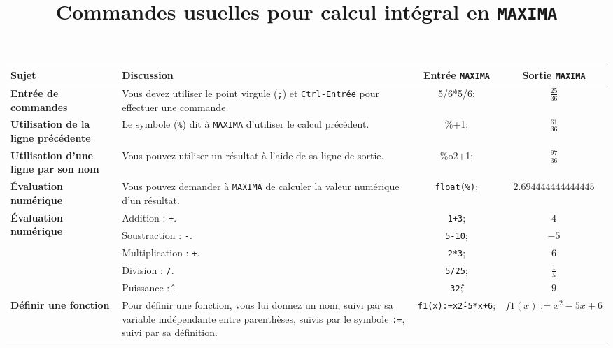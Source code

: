 \documentclass[landscape]{article}
\title{Commandes usuelles pour calcul intégral en \texttt{MAXIMA}}
\author{}
\date{}
\begin{document}
\maketitle

\begin{center}
\begin{longtable}{@{}p{4cm}p{12cm}cc@{}}
\toprule
\textbf{Sujet} & \textbf{Discussion} & \textbf{Entrée \texttt{MAXIMA}} & \textbf{Sortie \texttt{MAXIMA}} \\ 
\midrule
\endhead

\textbf{Entrée de commandes} & Vous devez utiliser le point virgule (\texttt{;}) et \texttt{Ctrl-Entrée} pour effectuer une commande &
5/6*5/6; & $\frac{25}{36}$ \\

\midrule

\textbf{Utilisation de la ligne précédente} & Le symbole (\texttt{\%}) dit à \texttt{MAXIMA} d'utiliser le calcul précédent. &
\%+1; & $\frac{61}{36}$ \\

\midrule

\textbf{Utilisation d'une ligne  par son nom} & Vous pouvez utiliser un résultat à l'aide de sa ligne de sortie. &
\%o2+1; & $\frac{97}{36}$ \\

\midrule

\textbf{Évaluation numérique} & Vous pouvez demander à \texttt{MAXIMA} de calculer la valeur numérique d'un résultat. &
\texttt{float(\%)}; & $2.694444444444445$ \\

\midrule

\multirow{5}{*}{\textbf{Évaluation numérique}} & Addition : \texttt{+}. & \texttt{1+3}; & $4$ \\
& Soustraction : \texttt{-}. & \texttt{5-10}; & $-5$ \\
& Multiplication : \texttt{+}. & \texttt{2*3}; & $6$ \\
& Division : \texttt{/}. & \texttt{5/25}; & $\frac{1}{5}$ \\
& Puissance : \^. & \texttt{3\^2}; & $9$ \\

\midrule

\textbf{Définir une fonction} & Pour définir une fonction, vous lui donnez un nom, suivi par sa variable indépendante entre parenthèses, suivis par le symbole \texttt{:=}, suivi par sa définition. &
\texttt{f1(x):=x\^2-5*x+6}; & $f1(x):=x^2-5x+6$ \\


\end{longtable}
\end{center}
\end{document}
